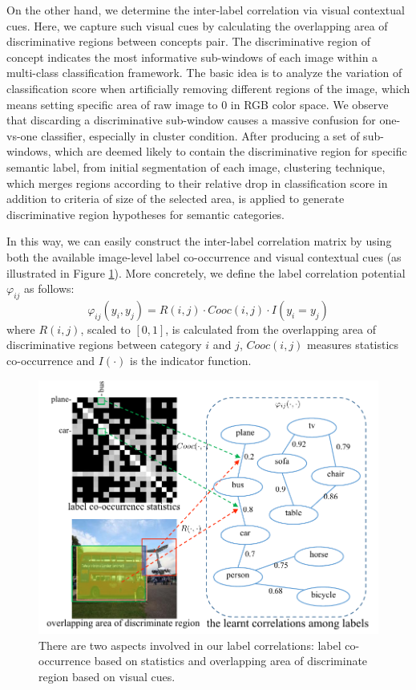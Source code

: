 On the other hand, we determine the inter-label correlation via visual contextual cues. Here, we capture such visual cues by calculating the overlapping area of discriminative regions between concepts pair.
The discriminative region of concept indicates the most informative sub-windows of each image within a multi-class classification framework.
The basic idea is to analyze the variation of classification score when artificially removing different regions of the image, which means setting specific area of raw image to 0 in RGB color space.
We observe that discarding a discriminative sub-window causes a massive confusion for one-vs-one classifier, especially in cluster condition.
After producing a set of sub-windows, which are deemed likely to contain the discriminative region for specific semantic label, from initial segmentation of each image, clustering technique, which merges regions according to their relative drop in classification score in addition to criteria of size of the selected area, is applied to generate discriminative region hypotheses for semantic categories.

In this way, we can easily construct the inter-label correlation matrix by using both the available image-level label co-occurrence and visual contextual cues (as illustrated in Figure \ref{fig:correlations}).
More concretely, we define the label correlation potential $\varphi_{ij}$ as follows:
\begin{equation}
    \varphi_{ij}(y_i,y_j) = R(i,j) \cdot Cooc(i,j) \cdot I(y_i=y_j)
\end{equation}
where $R(i,j)$, scaled to $[0,1]$, is calculated from the overlapping area of discriminative regions between category $i$ and $j$, $Cooc(i,j)$ measures statistics co-occurrence and $I(\cdot)$ is the indicator function.

\begin{figure}[t]
    \begin{center}
        \includegraphics[width=1\linewidth]{fig_correlations.pdf}
    \end{center}
    \caption{There are two aspects involved in our label correlations: label co-occurrence based on statistics and overlapping area of discriminate region based on visual cues.}
    \label{fig:correlations}
\end{figure}

